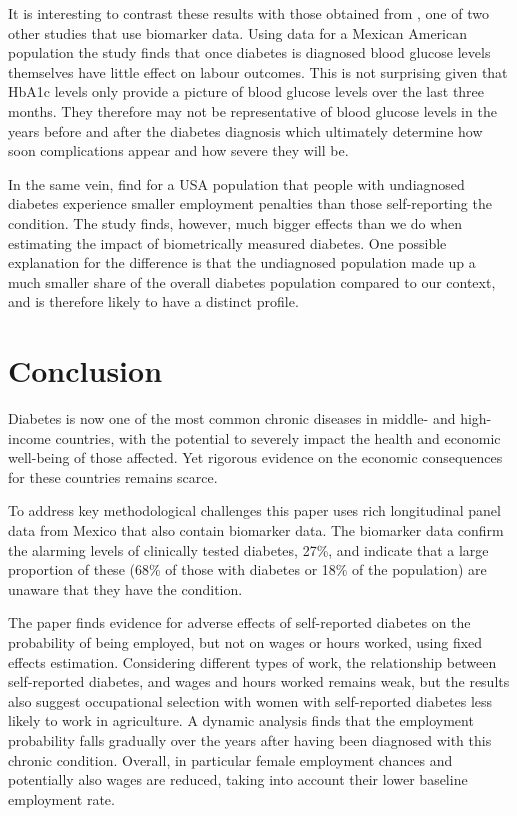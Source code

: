 \documentclass[12pt,english]{article}
\begin{document}
It is interesting to contrast these results with those obtained from \textcite{BrownIII2011}, one of two other studies that use biomarker data. Using data for a Mexican American population the study finds that once diabetes is diagnosed blood glucose levels themselves have little effect on labour outcomes. This is not surprising given that HbA1c levels only provide a picture of blood glucose levels over the last three months. They therefore may not be representative of blood glucose levels in the years before and after the diabetes diagnosis which ultimately determine how soon complications appear and how severe they will be.

In the same vein, \textcite{Minor2015} find for a USA population that people with undiagnosed diabetes experience smaller employment penalties than those self-reporting the condition. The study finds, however, much bigger effects than we do when estimating the impact of biometrically measured diabetes. One possible explanation for the difference is that the undiagnosed population made up a much smaller share of the overall diabetes population compared to our context, and is therefore likely to have a distinct profile.
\FloatBarrier


\section{\label{sec:cha_4_conclusion}Conclusion}

Diabetes is now one of the most common chronic diseases in middle- and high-income countries, with the potential to severely impact the health and economic well-being of those affected. Yet rigorous evidence on the economic consequences for these countries remains scarce.

To address key methodological challenges this paper uses rich longitudinal panel data from Mexico that also contain biomarker data. The biomarker data confirm the alarming levels of clinically tested diabetes, 27\%, and indicate that a large proportion of these (68\% of those with diabetes or 18\% of the population) are unaware that they have the condition. 

The paper finds evidence for adverse effects of self-reported diabetes on the probability of being employed, but not on wages or hours worked, using fixed effects estimation.  Considering different types of work, the relationship between self-reported diabetes, and wages and hours worked remains weak, but the results also suggest occupational selection with women with self-reported diabetes less likely to work in agriculture.  A dynamic analysis finds that the employment probability falls gradually over the years after having been diagnosed with this chronic condition. Overall, in particular female employment chances and potentially also wages are reduced, taking into account their lower baseline employment rate.
\end{document}
